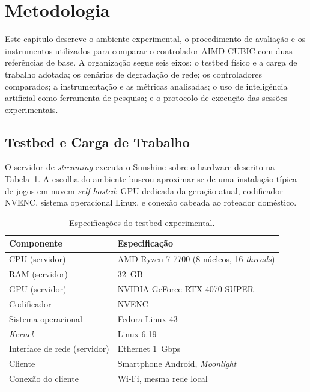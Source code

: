 \section{Metodologia}\label{sec:metodologia}

Este capítulo descreve o ambiente experimental, o procedimento
de avaliação e os instrumentos utilizados para comparar o
controlador AIMD CUBIC com duas referências de base. A
organização segue seis eixos: o testbed físico e a carga de
trabalho adotada; os cenários de degradação de rede; os
controladores comparados; a instrumentação e as métricas
analisadas; o uso de inteligência artificial como ferramenta de
pesquisa; e o protocolo de execução das sessões experimentais.

\subsection{Testbed e Carga de Trabalho}

O servidor de \emph{streaming} executa o Sunshine sobre o
hardware descrito na Tabela~\ref{tab:testbed}. A escolha do
ambiente buscou aproximar-se de uma instalação típica de jogos
em nuvem \emph{self-hosted}: GPU dedicada da geração atual,
codificador NVENC, sistema operacional Linux, e conexão
cabeada ao roteador doméstico.

\begin{table}[!t]
  \caption{Especificações do testbed experimental.}
  \label{tab:testbed}
  \centering
  \begin{tabular}{ll}
    \toprule
    \textbf{Componente} & \textbf{Especificação} \\
    \midrule
    CPU (servidor) & AMD Ryzen 7 7700 (8 núcleos, 16 \emph{threads}) \\
    RAM (servidor) & 32~GB \\
    GPU (servidor) & NVIDIA GeForce RTX 4070 SUPER \\
    Codificador & NVENC \\
    Sistema operacional & Fedora Linux 43 \\
    \emph{Kernel} & Linux 6.19 \\
    Interface de rede (servidor) & Ethernet 1~Gbps \\
    Cliente & Smartphone Android, \emph{Moonlight} \\
    Conexão do cliente & Wi-Fi, mesma rede local \\
    \bottomrule
  \end{tabular}
\end{table}

